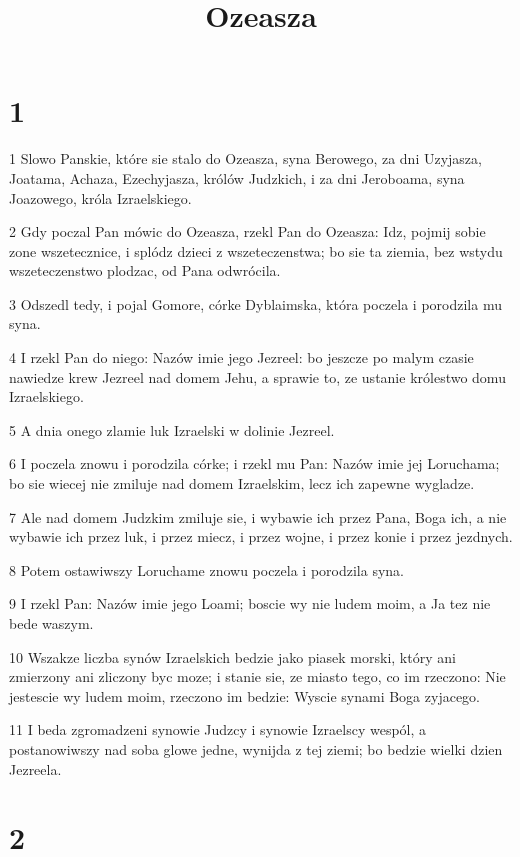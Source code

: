 

\title{Ozeasza}


\chapter{1}

\par 1 Slowo Panskie, które sie stalo do Ozeasza, syna Berowego, za dni Uzyjasza, Joatama, Achaza, Ezechyjasza, królów Judzkich, i za dni Jeroboama, syna Joazowego, króla Izraelskiego.
\par 2 Gdy poczal Pan mówic do Ozeasza, rzekl Pan do Ozeasza: Idz, pojmij sobie zone wszetecznice, i splódz dzieci z wszeteczenstwa; bo sie ta ziemia, bez wstydu wszeteczenstwo plodzac, od Pana odwrócila.
\par 3 Odszedl tedy, i pojal Gomore, córke Dyblaimska, która poczela i porodzila mu syna.
\par 4 I rzekl Pan do niego: Nazów imie jego Jezreel: bo jeszcze po malym czasie nawiedze krew Jezreel nad domem Jehu, a sprawie to, ze ustanie królestwo domu Izraelskiego.
\par 5 A dnia onego zlamie luk Izraelski w dolinie Jezreel.
\par 6 I poczela znowu i porodzila córke; i rzekl mu Pan: Nazów imie jej Loruchama; bo sie wiecej nie zmiluje nad domem Izraelskim, lecz ich zapewne wygladze.
\par 7 Ale nad domem Judzkim zmiluje sie, i wybawie ich przez Pana, Boga ich, a nie wybawie ich przez luk, i przez miecz, i przez wojne, i przez konie i przez jezdnych.
\par 8 Potem ostawiwszy Loruchame znowu poczela i porodzila syna.
\par 9 I rzekl Pan: Nazów imie jego Loami; boscie wy nie ludem moim, a Ja tez nie bede waszym.
\par 10 Wszakze liczba synów Izraelskich bedzie jako piasek morski, który ani zmierzony ani zliczony byc moze; i stanie sie, ze miasto tego, co im rzeczono: Nie jestescie wy ludem moim, rzeczono im bedzie: Wyscie synami Boga zyjacego.
\par 11 I beda zgromadzeni synowie Judzcy i synowie Izraelscy wespól, a postanowiwszy nad soba glowe jedne, wynijda z tej ziemi; bo bedzie wielki dzien Jezreela.

\chapter{2}

